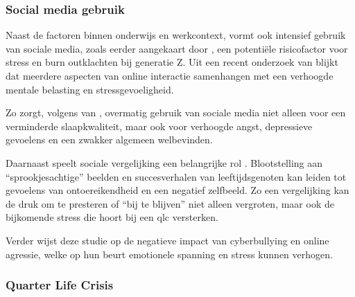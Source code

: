 \vspace{1em}

\subsubsection{Social media gebruik}
\label{subsubsec:social-media-gebruik}

\vspace{1em}

Naast de factoren binnen onderwijs en werkcontext, vormt ook intensief gebruik van sociale media, zoals eerder aangekaart door \textcite{Chong2025}, een potentiële risicofactor voor stress en burn outklachten bij generatie Z. Uit een recent onderzoek van \textcite{CabezasKlinger2025} blijkt dat meerdere aspecten van online interactie samenhangen met een verhoogde mentale belasting en stressgevoeligheid.

\vspace{1em}

Zo zorgt, volgens van \textcite{CabezasKlinger2025}, overmatig gebruik van sociale media niet alleen voor een verminderde slaapkwaliteit, maar ook voor verhoogde angst, depressieve gevoelens en een zwakker algemeen welbevinden.

\vspace{1em}

Daarnaast speelt sociale vergelijking een belangrijke rol \autocite{CabezasKlinger2025}. Blootstelling aan “sprookjesachtige” beelden en succesverhalen van leeftijdsgenoten kan leiden tot gevoelens van ontoereikendheid en een negatief zelfbeeld. Zo een vergelijking kan de druk om te presteren of “bij te blijven” niet alleen vergroten, maar ook de bijkomende stress die hoort bij een \acrshort{qlc} versterken.

\vspace{1em}

Verder wijst deze studie \autocite{CabezasKlinger2025} op de negatieve impact van cyberbullying en online agressie, welke op hun beurt emotionele spanning en stress kunnen verhogen.

\vspace{1em}

\subsubsection{Quarter Life Crisis}
\label{subsubsec:quarter-life-crisis}

\vspace{1em}

